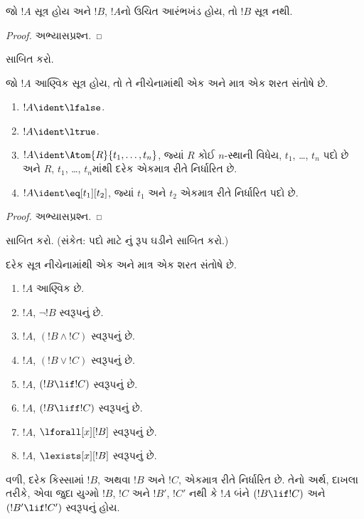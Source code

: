 \begin{lem}
જો $!A$ સૂત્ર હોય અને $!B$, $!A$નો ઉચિત આરંભખંડ હોય, તો
$!B$ સૂત્ર નથી.
\end{lem}

\begin{proof}
અભ્યાસપ્રશ્ન.
\end{proof}

\begin{prob}
 સાબિત કરો.
\end{prob}

\begin{prop}
જો $!A$ આણ્વિક સૂત્ર હોય, તો તે નીચેનામાંથી એક અને માત્ર એક
શરત સંતોષે છે.
\begin{enumerate}
\item $!A \ident \lfalse$.
\item $!A \ident \ltrue$.
\item $!A \ident \Atom{R}{t_1,\dots,t_n}$, જ્યાં $R$ કોઈ $n$-સ્થાની
  વિધેય, $t_1$, \dots, $t_n$ પદો છે અને $R$, $t_1$, \dots,
  $t_n$માંથી દરેક એકમાત્ર રીતે નિર્ધારિત છે.
\item $!A \ident \eq[t_1][t_2]$, જ્યાં $t_1$ અને $t_2$ એકમાત્ર રીતે
  નિર્ધારિત પદો છે.
\end{enumerate}
\end{prop}

\begin{proof}
અભ્યાસપ્રશ્ન.
\end{proof}

\begin{prob}
 સાબિત કરો. (સંકેત: પદો માટે
નું રૂપ ઘડીને સાબિત કરો.)
\end{prob}

\begin{prop}[એકમાત્ર વાચનીયતા]
દરેક સૂત્ર નીચેનામાંથી એક અને માત્ર એક શરત સંતોષે છે.
\begin{enumerate}
\item $!A$ આણ્વિક છે.

\item $!A$, $\lnot !B$ સ્વરૂપનું છે.

\item $!A$, $(!B \land !C)$ સ્વરૂપનું છે.

\item $!A$, $(!B \lor !C)$ સ્વરૂપનું છે.

\item $!A$, $(!B \lif !C)$ સ્વરૂપનું છે.

\item $!A$, $(!B \liff !C)$ સ્વરૂપનું છે.

\item $!A$, $\lforall[x][!B]$ સ્વરૂપનું છે.

\item $!A$, $\lexists[x][!B]$ સ્વરૂપનું છે.
\end{enumerate}
વળી, દરેક કિસ્સામાં $!B$, અથવા $!B$ અને $!C$, એકમાત્ર રીતે
નિર્ધારિત છે. તેનો અર્થ, દાખલા તરીકે, એવા જુદા યુગ્મો $!B$, $!C$ અને
$!B'$, $!C'$ નથી કે $!A$ બંને
$(!B \lif !C)$ અને $(!B' \lif !C')$ સ્વરૂપનું હોય.
\end{prop}

